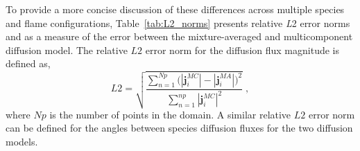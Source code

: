 \documentclass[preprint,review,12pt]{elsarticle}
\begin{document}
To provide a more concise discussion of these differences across multiple species and flame configurations, Table~\ref{tab:L2_norms} presents relative \textit{L}2 error norms and  as a measure of the error between the mixture-averaged and multicomponent diffusion model.
The relative $L2$ error norm for the diffusion flux magnitude is defined as,
\begin{equation} \label{11}
L2 = \sqrt{\frac{\sum_{n=1}^{Np}\bigg(|\textbf{j}_{i}^{MC}|-|\textbf{j}_{i}^{MA}|\bigg)^{2}}{\sum_{n=1}^{np}|\textbf{j}_{i}^{MC}|^{2}}} \;,
\end{equation}
where $Np$ is the number of points in the domain.  
A similar relative $L2$ error norm can be defined for the angles between species diffusion fluxes for the two diffusion models.
\end{document}
